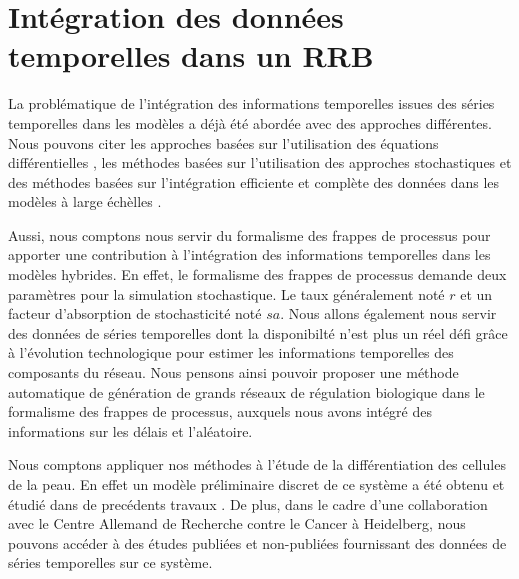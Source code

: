 \section{Intégration des données temporelles dans un RRB}
La problématique de l'intégration des informations temporelles issues des séries temporelles dans les modèles a déjà été abordée avec des approches différentes. Nous pouvons 
citer les approches basées sur l'utilisation des équations différentielles \cite{batt2005validation,mobashir2012simulated,tyson2003sniffers}, les méthodes basées sur l'utilisation
des approches stochastiques \cite{macnamara2012state} et des méthodes basées sur l'intégration efficiente et complète des données dans les modèles à large échèlles \cite{guziolowski2013exhaustively,mitsos2009identifying}.

Aussi, nous comptons nous servir du formalisme des frappes de processus pour apporter une contribution à l'intégration des informations temporelles dans les modèles hybrides.
En effet, le formalisme des frappes de processus demande deux paramètres pour la simulation stochastique. Le taux généralement noté $r$ et un facteur d'absorption de 
stochasticité noté $sa$. Nous allons également nous servir des données de séries temporelles dont la disponibilté n'est plus un réel défi grâce à l'évolution technologique
pour estimer les informations temporelles des composants du réseau. Nous pensons ainsi pouvoir proposer une méthode automatique de génération de grands réseaux de régulation
biologique dans le formalisme des frappes de processus, auxquels nous avons intégré des informations sur les délais et l'aléatoire.


Nous comptons appliquer nos méthodes à l'étude de la différentiation des cellules de la peau. En effet un modèle préliminaire discret de ce système  a été obtenu et étudié 
dans de precédents travaux \cite{guziolowski2012automatic}. De plus, dans le cadre d'une collaboration avec le Centre Allemand de Recherche contre le Cancer à Heidelberg, nous pouvons accéder à des études
publiées et non-publiées fournissant des données de séries temporelles sur ce système.


